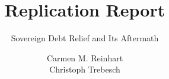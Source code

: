 \documentclass{tudelft-report}
\begin{document}
\frontmatter

\title{Replication Report}
\subtitle{Sovereign Debt Relief and Its Aftermath }
\author{Carmen M. Reinhart \\
Christoph Trebesch}





% 
% 

\tableofcontents

% 


\mainmatter





 

% 

\setcounter{biburlnumpenalty}{7000}
\setcounter{biburllcpenalty}{7000}
\setcounter{biburlucpenalty}{7000}

\printbibliography[heading=bibintoc,title=References]



% 
% 
\end{document}
